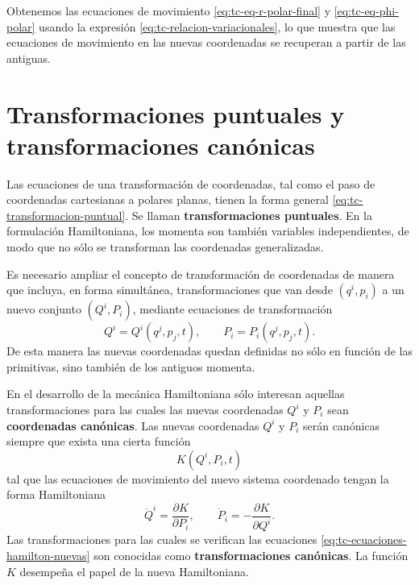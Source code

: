 \documentclass[../apunte_mecanica_clasica.tex]{subfiles}
\begin{document}
Obtenemos las ecuaciones de movimiento \eqref{eq:tc-eq-r-polar-final} y \eqref{eq:tc-eq-phi-polar} usando la expresión \eqref{eq:tc-relacion-variacionales}, lo que muestra que las ecuaciones de movimiento en las nuevas coordenadas se recuperan a partir de las antiguas.

\section{Transformaciones puntuales y transformaciones canónicas}
\label{sec:tc-puntuales-canonicas}

Las ecuaciones de una transformación de coordenadas, tal como el paso de coordenadas cartesianas a polares planas, tienen la forma general \eqref{eq:tc-transformacion-puntual}. Se llaman \textbf{transformaciones puntuales}. En la formulación Hamiltoniana, los momenta son también variables independientes, de modo que no sólo se transforman las coordenadas generalizadas.

Es necesario ampliar el concepto de transformación de coordenadas de manera que incluya, en forma simultánea, transformaciones que van desde \((q^i,p_i)\) a un nuevo conjunto \((Q^i,P_i)\), mediante ecuaciones de transformación
\begin{equation}
    Q^i=Q^i(q^j,p_j,t),
    \qquad
    P_i=P_i(q^j,p_j,t).
    \label{eq:tc-transformacion-fase}
\end{equation}
De esta manera las nuevas coordenadas quedan definidas no sólo en función de las primitivas, sino también de los antiguos momenta.

En el desarrollo de la mecánica Hamiltoniana sólo interesan aquellas transformaciones para las cuales las nuevas coordenadas \(Q^i\) y \(P_i\) sean \textbf{coordenadas canónicas}. Las nuevas coordenadas \(Q^i\) y \(P_i\) serán canónicas siempre que exista una cierta función
\begin{equation}
    K(Q^i,P_i,t)
    \label{eq:tc-nuevo-hamiltoniano}
\end{equation}
tal que las ecuaciones de movimiento del nuevo sistema coordenado tengan la forma Hamiltoniana
\begin{equation}
    \dot Q^i=\frac{\partial K}{\partial P_i},
    \qquad
    \dot P_i=-\frac{\partial K}{\partial Q^i}.
    \label{eq:tc-ecuaciones-hamilton-nuevas}
\end{equation}
Las transformaciones para las cuales se verifican las ecuaciones \eqref{eq:tc-ecuaciones-hamilton-nuevas} son conocidas como \textbf{transformaciones canónicas}. La función \(K\) desempeña el papel de la nueva Hamiltoniana.
\end{document}
